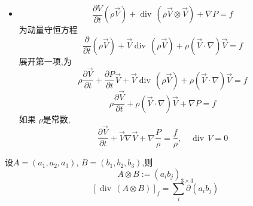 \documentclass[../../PDE.tex]{subfiles}
\begin{document}
\begin{itemize}
\begin{proof}
        \[
        \begin{aligned}
        I_2& =  -\int_{t_1}^{t_2}\,\mathrm{d} t \iint_{\partial n}v\left( \rho \vec{V} \cdot \vec{n}  \right)\,\mathrm{d} S\\ 
         & =  -\int_{t_1}^{t_2}\,\mathrm{d} t \iiint_{n}\left( v \operatorname{div}\,\left( \rho \vec{V}  \right)+  \rho  \vec{V}  \cdot  \nabla v  \right)   \,\mathrm{d} x\,\mathrm{d} y\,\mathrm{d} z
        \end{aligned}
        \] \[
        \begin{aligned}
        I_3& =  -\int_{t_1}^{t_2}\,\mathrm{d} t \iint_{\partial n} w\left( \rho  \vec{V} \cdot \vec{n}  \right)\,\mathrm{d} S\\ 
         & =  -\int_{t_1}  ^{t_2}\,\mathrm{d} t \iiint_{n} \left( w \operatorname{div}\,\left( \rho  \vec{V}  \right)+  \rho \vec{V} \cdot  \nabla w  \right)\,\mathrm{d} x\,\mathrm{d} y\,\mathrm{d} z 
        \end{aligned}
        \] \[
        I =  -\int_{t_1}^{t_2}\,\mathrm{d} t \iiint_{n} \left( \vec{V}  \operatorname{div}\,\left( \rho \vec{V}  \right)+  \rho \left( \vec{V}  \cdot  \nabla  \right)   \right)\vec{V} \,\mathrm{d} x\,\mathrm{d} y\,\mathrm{d} z 
        \]
        \hfill $\square$
    \end{proof}

    \item \[
    \frac{\partial V}{\partial t} \left( \rho \vec{V}  \right)+  \operatorname{div}\,\left( \rho  \vec{V} \otimes \vec{V}  \right) +   \nabla P= f  
    \]为动量守恒方程
     \[
     \frac{\partial }{\partial t}\left( \rho \vec{V}  \right)+ \vec{V}  \operatorname{div}\,\left( \rho \vec{V}  \right)+ \rho \left( \vec{V} \cdot  \nabla  \right)\vec{V} = f   
     \]展开第一项,为 \[
     \rho \frac{\partial \vec{V} }{\partial t} +  \frac{\partial P}{\partial t}\vec{V} +  \vec{V} \operatorname{div}\,\left( \rho \vec{V}  \right) + \rho \left( \vec{V} \cdot  \nabla  \right)\vec{V}  = f
     \] \[
     \rho \frac{\partial \vec{V} }{\partial t} + \rho \left( \vec{V} \cdot  \nabla  \right)\vec{V} +   \nabla P= f 
     \]如果 \(  \rho   \)是常数, \[
     \frac{\partial \vec{V} }{\partial t} +  \vec{V}  \nabla \vec{V } +   \nabla  \frac{P}{\rho } =  \frac{f}{\rho } ,\quad  \operatorname{div}\,V= 0
     \] 
\end{itemize}

\begin{definition}
    设\(  A =  \left( a_1,a_2,a_3 \right)   \), \(  B =  \left( b_1,b_2,b_3 \right)   \),则 \[
    A\otimes B :=  \left( a_{i}b_{j} \right)_{3\times 3} 
    \]  \[
    [\operatorname{div}\,\left( A\otimes B \right) ]_{j} =  \sum _{i}\partial _{}\left( a_{i}b_{j} \right) 
    \] 
\end{definition}
\end{document}
